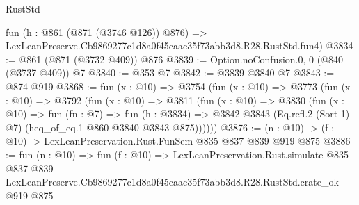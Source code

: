 \begin{lexlean}{RustStd}
\begin{coremodule}
    fun (h : @861 (@871 (@3746 @126)) @876) =>
    LexLeanPreserve.Cb9869277c1d8a0f45caac35f73abb3d8.R28.RustStd.fun4)
@3834 := @861 (@871 (@3732 @409)) @876
@3839 := Option.noConfusion.{0, 0} (@840 (@3737 @409)) @7
@3840 := @353 @7
@3842 := @3839 @3840 @7
@3843 := @874 @919
@3868 := fun (x : @10) =>
  @3754
    (fun (x : @10) =>
    @3773
      (fun (x : @10) =>
      @3792
        (fun (x : @10) =>
        @3811
          (fun (x : @10) =>
          @3830
            (fun (x : @10) =>
            fun (fn : @7) =>
            fun (h : @3834) =>
            @3842 @3843 (Eq.refl.{2} (Sort 1) @7) (heq_of_eq.{1} @860 @3840 @3843 @875))))))
@3876 := (n : @10) -> (f : @10) -> LexLeanPreservation.Rust.FunSem @835 @837 @839 @919 @875
@3886 := fun (n : @10) =>
  fun (f : @10) =>
  LexLeanPreservation.Rust.simulate
    @835
    @837
    @839
    LexLeanPreserve.Cb9869277c1d8a0f45caac35f73abb3d8.R28.RustStd.crate_ok
    @919
    @875
\end{coremodule}
\end{lexlean}

